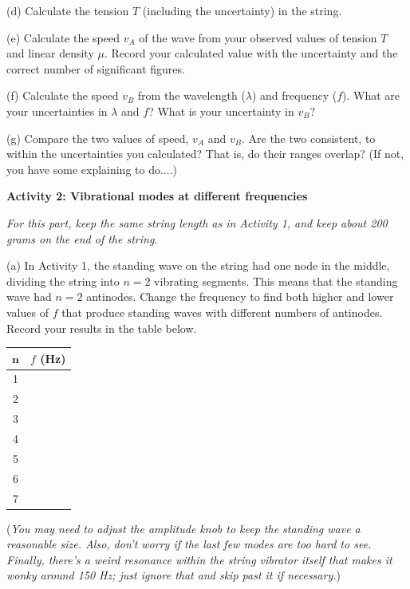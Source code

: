(d) Calculate the tension $T$ (including the uncertainty) in the string.
\answerspace{2cm}

\pagebreak[3]

(e) Calculate the speed $v_A$ of the wave from your observed values of tension
$T$ and linear density $\mu$. Record your calculated value with the uncertainty and the correct number of significant
figures.
\answerspace{4cm}

(f) Calculate the speed $v_B$ from the wavelength ($\lambda $) and frequency ($f$).  What are your uncertainties in $\lambda$ and $f$?  What is your uncertainty in $v_B?$
\answerspace{4cm}

(g) Compare the two values of speed, $v_A$ and $v_B$.  Are the two consistent, to within the uncertainties you calculated?  That is, do their ranges overlap?  (If not, you have some explaining to do....) 
\answerspace{3cm}

\pagebreak[2]
\textbf{Activity 2: Vibrational modes at different frequencies}

\textit{For this part, keep the same string length as in Activity 1, and keep about 200 grams on the end of the string.}

(a) In Activity 1, the standing wave on the string had one node in the middle, dividing the string into $n=2$ vibrating segments.  This means that the standing wave had $n=2$ antinodes.  Change the frequency to find both higher and lower values of $f$ that produce standing waves with different numbers of antinodes.  Record your results in the table below.
\begin{center} 
\begin{tabular}{|c|c|} 
\hline $\mathbf{n}$ & \boldmath$f$ \textbf{(Hz)} \\ 
\hline 1 &  \\ 
\hline 2 &  \\ 
\hline 3 &  \\ 
\hline 4 &  \\ 
\hline 5 &  \\ 
\hline 6 &  \\ 
\hline 7 &  \\ 
\hline 
\end{tabular} 
\end{center}

(\textit{You may need to adjust the amplitude knob to keep the standing wave a reasonable size.  Also, don't worry if the last few modes are too hard to see.  Finally, there's a weird resonance within the string vibrator itself that makes it wonky around 150 Hz; just ignore that and skip past it if necessary.})

